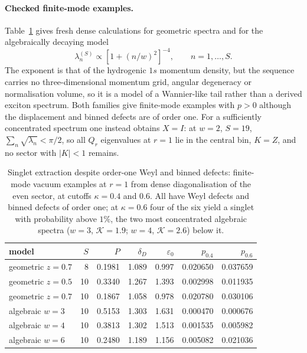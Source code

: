 \documentclass[11pt,a4paper]{article}
\begin{document}
\paragraph{Checked finite-mode examples.}
Table~\ref{tab:dense} gives fresh dense calculations for geometric spectra and for the algebraically decaying model
\begin{equation}
\lambda_n^{(S)}\propto[1+(n/w)^2]^{-4},\qquad n=1,\ldots,S.
\label{eq:algebraic}
\end{equation}
The exponent is that of the hydrogenic $1s$ momentum density, but the sequence carries no three-dimensional momentum grid, angular degeneracy or normalisation volume, so it is a model of a Wannier-like tail rather than a derived exciton spectrum. Both families give finite-mode examples with $p>0$ although the displacement and binned defects are of order one. For a sufficiently concentrated spectrum one instead obtains $X=I$: at $w=2$, $S=19$, $\sum_n\sqrt{\lambda_n}<\pi/2$, so all $Q_r$ eigenvalues at $r=1$ lie in the central bin, $K=Z$, and no sector with $|K|<1$ remains.

\begin{table}[t]
\centering\small
\begin{tabular}{lrrrrrr}
\toprule
model & $S$ & $P$ & $\delta_D$ & $\varepsilon_0$ & $p_{0.4}$ & $p_{0.6}$\\
\midrule
geometric $z=0.7$ & 8 & 0.1981 & 1.089 & 0.997 & 0.020650 & 0.037659\\
geometric $z=0.5$ & 10 & 0.3340 & 1.267 & 1.393 & 0.002998 & 0.011935\\
geometric $z=0.7$ & 10 & 0.1867 & 1.058 & 0.978 & 0.020780 & 0.030106\\
algebraic $w=3$ & 10 & 0.5153 & 1.303 & 1.631 & 0.000470 & 0.000676\\
algebraic $w=4$ & 10 & 0.3813 & 1.302 & 1.513 & 0.001535 & 0.005982\\
algebraic $w=6$ & 10 & 0.2480 & 1.189 & 1.156 & 0.005082 & 0.021036\\
\bottomrule
\end{tabular}
\caption{Singlet extraction despite order-one Weyl and binned defects: finite-mode vacuum examples at $r=1$ from dense diagonalisation of the even sector, at cutoffs $\kappa=0.4$ and $0.6$. All have Weyl defects and binned defects of order one; at $\kappa=0.6$ four of the six yield a singlet with probability above $1\%$, the two most concentrated algebraic spectra ($w=3$, $\mathcal K=1.9$; $w=4$, $\mathcal K=2.6$) below it.}
\label{tab:dense}
\end{table}
\end{document}
